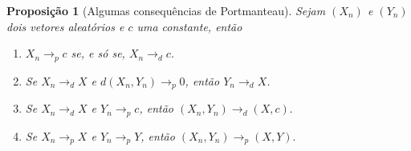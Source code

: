 \documentclass[12pt,a4paper,oneside]{book}
\newtheorem{proposition}[theorem]{Proposi\c{c}\~ao}
\theoremstyle{definition}
\theoremstyle{remark}
\numberwithin{equation}{section}
\begin{document}
\begin{tcolorbox}
\begin{proposition}[Algumas consequências de Portmanteau]\label{prop - conseq-portmnt} Sejam $(X_n)$ e $(Y_n)$ dois vetores aleatórios e $c$ uma constante, então
\begin{enumerate}
\item  $X_n \rightarrow_p c$ se, e só se, $X_n \rightarrow_d c$.

\item  Se $X_n \rightarrow_d X$ e $d(X_n,Y_n) \rightarrow_p 0 $, então $Y_n \rightarrow_d X$.

\item  Se $X_n \rightarrow_d X$ e $Y_n \rightarrow_p c $, então $(X_n,Y_n)\rightarrow_d (X,c).$

\item  Se $X_n \rightarrow_p X$ e $Y_n \rightarrow_p Y $, então $(X_n,Y_n)\rightarrow_p (X,Y).$
\end{enumerate}

\end{proposition}


\end{tcolorbox}
\end{document}
